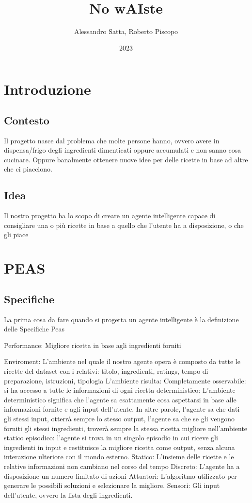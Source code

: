 \documentclass[12pt]{report}
\title{No wAIste}
\author{Alessandro Satta, Roberto Piscopo}
\date{2023}
\begin{document}
\maketitle
\tableofcontents

\chapter{Introduzione}
\section{Contesto}    
Il progetto nasce dal problema che molte persone hanno, ovvero avere in dispensa/frigo degli ingredienti dimenticati oppure accumulati e non sanno cosa cucinare. Oppure banalmente ottenere nuove idee per delle ricette in base ad altre che ci piacciono.

\section{Idea}
Il nostro progetto ha lo scopo di creare un agente intelligente capace di consigliare una o più ricette in base a quello che l’utente ha a disposizione, o che gli piace 

\chapter{PEAS}
\section{Specifiche}
La prima cosa da fare quando si progetta un agente intelligente è la definizione delle Specifiche Peas

Performance: Migliore ricetta in base agli ingredienti forniti

Enviroment: L’ambiente nel quale il nostro agente opera è composto da tutte le ricette del dataset con i relativi: titolo, ingredienti, ratings, tempo di preparazione, istruzioni, tipologia
L’ambiente risulta:
Completamente osservabile: si ha accesso a tutte le informazioni di ogni ricetta
deterministico: L'ambiente deterministico significa che l'agente sa esattamente cosa aspettarsi in base alle informazioni fornite e agli input dell'utente. In altre parole, l'agente sa che dati gli stessi input, otterrà sempre lo stesso output, l'agente sa che se gli vengono forniti gli stessi ingredienti, troverà sempre la stessa ricetta migliore nell'ambiente statico
episodico: l'agente si trova in un singolo episodio in cui riceve gli ingredienti in input e restituisce la migliore ricetta come output, senza alcuna interazione ulteriore con il mondo esterno.
Statico: L’insieme delle ricette e le relative informazioni non cambiano nel corso del tempo
Discreto: L’agente ha a disposizione un numero limitato di azioni
Attuatori: L'algoritmo utilizzato per generare le possibili soluzioni e selezionare la migliore. 
Sensori: Gli input dell'utente, ovvero la lista degli ingredienti.
\end{document}
